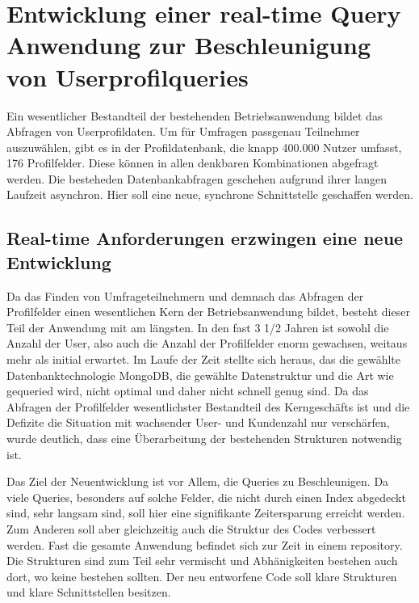 \chapter{Entwicklung einer real-time Query Anwendung zur Beschleunigung von Userprofilqueries}
Ein wesentlicher Bestandteil der bestehenden Betriebsanwendung bildet das Abfragen von Userprofildaten. Um für Umfragen passgenau Teilnehmer auszuwählen, gibt es in der Profildatenbank, die knapp 400.000 Nutzer umfasst, 176 Profilfelder. Diese können in allen denkbaren Kombinationen abgefragt werden. Die besteheden Datenbankabfragen geschehen aufgrund ihrer langen Laufzeit asynchron. Hier soll eine neue, synchrone Schnittstelle geschaffen werden.

\section{Real-time Anforderungen erzwingen eine neue Entwicklung}
Da das Finden von Umfrageteilnehmern und demnach das Abfragen der Profilfelder einen wesentlichen Kern der Betriebsanwendung bildet, besteht dieser Teil der Anwendung mit am längsten. In den fast 3 1/2 Jahren ist sowohl die Anzahl der User, also auch die Anzahl der Profilfelder enorm gewachsen, weitaus mehr als initial erwartet. Im Laufe der Zeit stellte sich heraus, das die gewählte Datenbanktechnologie MongoDB, die gewählte Datenstruktur und die Art wie gequeried wird, nicht optimal und daher nicht schnell genug sind. Da das Abfragen der Profilfelder wesentlichster Bestandteil des Kerngeschäfts ist und die Defizite die Situation mit wachsender User- und Kundenzahl nur verschärfen, wurde deutlich, dass eine Überarbeitung der bestehenden Strukturen notwendig ist.

Das Ziel der Neuentwicklung ist vor Allem, die Queries zu Beschleunigen. Da viele Queries, besonders auf solche Felder, die nicht durch einen Index abgedeckt sind, sehr langsam sind, soll hier eine signifikante Zeitersparung erreicht werden. Zum Anderen soll aber gleichzeitig auch die Struktur des Codes verbessert werden. Fast die gesamte Anwendung befindet sich zur Zeit in einem repository. Die Strukturen sind zum Teil sehr vermischt und Abhänigkeiten bestehen auch dort, wo keine bestehen sollten. Der neu entworfene Code soll klare Strukturen und klare Schnittstellen besitzen.

